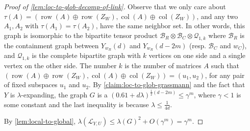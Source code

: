 \documentclass[10pt,a4paper]{article}
\newcommand{\prettyref}[1]{\cref{#1}}
\theoremstyle{definition}
\theoremstyle{remark}
\newcommand{\Authornotecolored}[3]{{\sffamily\small\color{#1}{[#2: #3]}}}
\newcommand{\Authornotecolored}[3]{}
\newcommand{\Snote}{\Authornotecolored{Green}{S}}
\newcommand{\snote}{\Snote}
\newcommand{\set}[1]{\{#1\}}
\DeclareMathOperator{\row}{row}
\DeclareMathOperator{\col}{col}
\renewcommand{\leq}{\leqslant}
\renewcommand{\geq}{\geqslant}
\numberwithin{equation}{section}
\let\pref=\prettyref
\def\Y{Y}
\def\SL{\mathcal{L}}
\def\T{T}
\def\B{\mathcal{H}}
\def\diml{d}
\def\dimlin{{\diml}}
\def\lambdai{\lambda}
\def\dimm{\ell}
\def\Stwo{\mathcal{S}}
\begin{document}
\begin{proof}[Proof of \pref{lem:loc-to-glob-decomp-of-link}]
    Observe that we only care about \(\tau(A) = (\row(A) \oplus \row(Z_W),\col(A) \oplus \col(Z_W))\), and any two \(A_1,A_2\) with \(\tau(A_1) = \tau(A_2)\), have the same neighbor set. In other words, this graph is isomorphic to the bipartite tensor product \(\mathcal{B}_R \otimes \mathcal{B}_C \otimes \mathcal{Q}_{1,k}\) where \(\mathcal{B}_R\) is the containment graph between \(\Y_{w_R}(\dimlin)\) and \(\Y_{w_R}(\dimlin-2m)\) (resp. \(\mathcal{B}_C\) and \(w_C\)), and \(\mathcal{Q}_{1,k}\) is the complete bipartite graph with \(k\) vertices on one side and a single vertex on the other side. The number \(k\) is the number of matrices \(A\) such that  \((\row(A) \oplus \row(Z_W),\col(A) \oplus \col(Z_W)) = (u_1,u_2)\), for any pair of fixed subspaces \(u_1\) and \(u_2\). By \pref{claim:loc-to-glob-grassmann} and the fact that \(\Y\) is \(\lambdai\)-expanding, the graph \(G\) is a \(\left ( 0.61 + \dimlin \lambdai\right )^{\frac{1}{2} (\dimlin-2m)}\leq \gamma^{m} \), where \(\gamma < 1\) is some constant and the last inequality is because \(\lambdai \leq \frac{1}{4d}\). %

    By \pref{lem:local-to-global}, \(\lambda(\SL_{\Y,U}) \leq \lambda(G)^2 + O(\gamma^{ m}) = \gamma^{m}\).
\end{proof}

\end{document}
